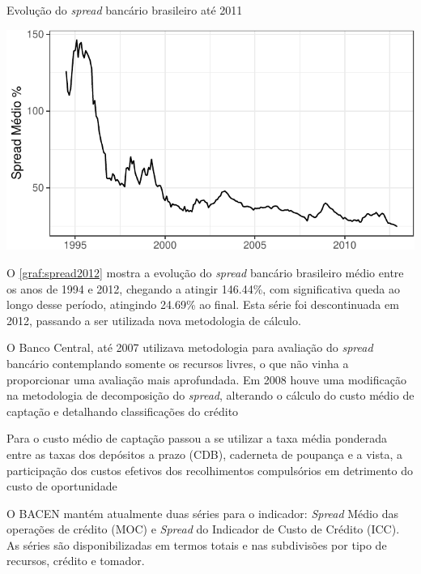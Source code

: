 \documentclass[
  12pt,
  12pt,
  openright,
  oneside,
  a4paper,
  chapter=TITLE,
  section=TITLE,
  subsection=TITLE,
  subsubsection=TITLE,
  english,
  portugues,
  sumario=tradicional]{abntex2}
\begin{document}
\begin{grafico}[!hbtp]
\vspace{20pt}
\caption{Evolução do \emph{spread} bancário brasileiro até 2011}
\vspace{-4mm}

\begin{center}\includegraphics{12-exportedfigures/average spread-1} \end{center}
\vspace{-3mm}
\label{graf:spread2012}
\vspace{-2mm}
\end{grafico}

O \autoref{graf:spread2012} mostra a evolução do \emph{spread} bancário brasileiro médio entre os anos de 1994 e 2012, chegando a atingir 146.44\%, com significativa queda ao longo desse período, atingindo 24.69\% ao final. Esta série foi descontinuada em 2012, passando a ser utilizada nova metodologia de cálculo.

O Banco Central, até 2007 utilizava metodologia para avaliação do \emph{spread} bancário contemplando somente os recursos livres, o que não vinha a proporcionar uma avaliação mais aprofundada. Em 2008 houve uma modificação na metodologia de decomposição do \emph{spread}, alterando o cálculo do custo médio de captação e detalhando classificações do crédito \cite{dantas:2012}

Para o custo médio de captação passou a se utilizar a taxa média ponderada entre as taxas dos depósitos a prazo (CDB), caderneta de poupança e a vista, a participação dos custos efetivos dos recolhimentos compulsórios em detrimento do custo de oportunidade \cite{dantas:2012}

O BACEN mantém atualmente duas séries para o indicador: \emph{Spread} Médio das operações de crédito (MOC) e \emph{Spread} do Indicador de Custo de Crédito (ICC). As séries são disponibilizadas em termos totais e nas subdivisões por tipo de
recursos, crédito e tomador.
\end{document}
